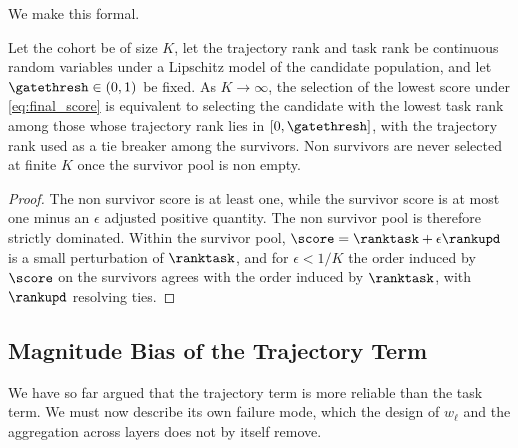 We make this formal.

\begin{proposition}
\label{prop:gate_equiv}
Let the cohort be of size $K$, let the trajectory rank and task rank be continuous random variables under a Lipschitz model of the candidate population, and let $\gatethresh \in (0, 1)$ be fixed. As $K \to \infty$, the selection of the lowest score under \eqref{eq:final_score} is equivalent to selecting the candidate with the lowest task rank among those whose trajectory rank lies in $[0, \gatethresh]$, with the trajectory rank used as a tie breaker among the survivors. Non survivors are never selected at finite $K$ once the survivor pool is non empty.
\end{proposition}
\begin{proof}
The non survivor score is at least one, while the survivor score is at most one minus an $\epsilon$ adjusted positive quantity. The non survivor pool is therefore strictly dominated. Within the survivor pool, $\score = \ranktask + \epsilon \rankupd$ is a small perturbation of $\ranktask$, and for $\epsilon < 1/K$ the order induced by $\score$ on the survivors agrees with the order induced by $\ranktask$, with $\rankupd$ resolving ties.
\end{proof}

\subsection{Magnitude Bias of the Trajectory Term}
\label{sec:metric_failure}

We have so far argued that the trajectory term is more reliable than the task term. We must now describe its own failure mode, which the design of $w_\ell$ and the aggregation across layers does not by itself remove.

